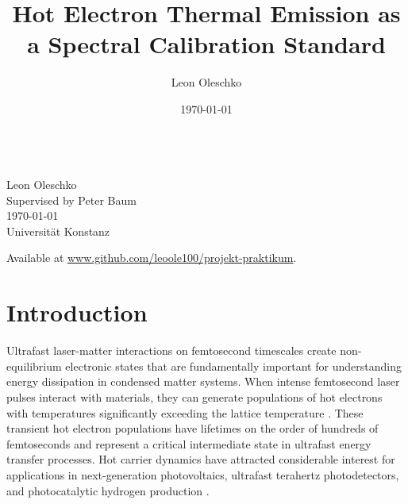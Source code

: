 \documentclass[
	parskip=half,
	a4paper,
]{scrarticle}
\begin{document}
\title{Hot Electron Thermal Emission as a Spectral Calibration Standard}
\author{Leon Oleschko}
\date{\dotdate\today}

\begin{titlepage}
    \sffamily
    \vspace*{3cm}
    {
        \fontsize{32}{32}
    }
    \vspace{.25cm}\\
    {
        \Large
        Leon Oleschko\\
        Supervised by Peter Baum
        \vspace{.05cm}\\
        \dotdate\today\\
        Universität Konstanz
    }
    \vfill
    {
        \normalfont\normalsize

    }
    \vfill
    \begin{flushright}
        Available at \url{www.github.com/leoole100/projekt-praktikum}.
    \end{flushright}
\end{titlepage}


\clearpage
\section{Introduction}
Ultrafast laser-matter interactions on femtosecond timescales create non-equilibrium electronic states that are fundamentally important for understanding energy dissipation in condensed matter systems. When intense femtosecond laser pulses interact with materials, they can generate populations of hot electrons with temperatures significantly exceeding the lattice temperature \cite{lui_ultrafast_2010}. 
These transient hot electron populations have lifetimes on the order of hundreds of femtoseconds \cite{stange_hot_2015} and represent a critical intermediate state in ultrafast energy transfer processes. 
Hot carrier dynamics have attracted considerable interest for applications in next-generation photovoltaics, ultrafast terahertz photodetectors, and photocatalytic hydrogen production \cite{tang_plasmonic_2020,konig_hot_2010}.
\end{document}

